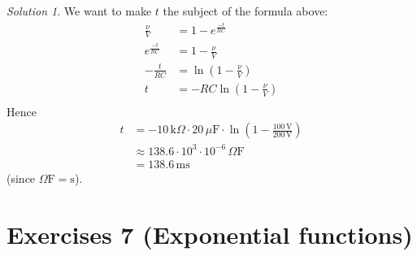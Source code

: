 \documentclass[
  12pt,
  oneside]{book}
\theoremstyle{definition}
\theoremstyle{definition}
\theoremstyle{definition}
\theoremstyle{definition}
\theoremstyle{remark}
\newtheorem*{solution}{Solution}
\begin{document}
\begin{solution}
We want to make \(t\) the subject of the formula above:
\begin{align*}
\frac{\nu}{V} &=1-e^{\frac{-t}{RC}}\\
e^{\frac{-t}{RC}} &= 1-\frac{\nu}{V}\\
-\frac{t}{RC} &= \ln\left(1-\frac{\nu}{V}\right)\\
t &= -RC\ln\left(1-\frac{\nu}{V}\right)\\
\end{align*}
Hence
\begin{align*}
t&=-10\,\mathrm{k}\Omega\cdot 20\,\mu\mathrm{F}\cdot \ln\left(1-\frac{100\,\mathrm{V}}{200\,\mathrm{V}}\right)\\
&\approx 138.6\cdot 10^3\cdot 10^{-6} \,\Omega\mathrm{F}\\
&= 138.6 \,\mathrm{ms}
\end{align*}
(since \(\Omega\mathrm{F} = \mathrm{s}\)).
\end{solution}

\hypertarget{exercises-7-exponential-functions}{%
\chapter*{Exercises 7 (Exponential functions)}\label{exercises-7-exponential-functions}}
\end{document}
